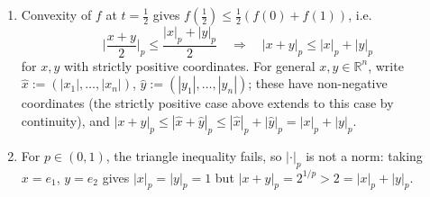 \begin{exercisesolution}
\begin{enumerate}[label=\textbf{\arabic*.}]
    shows the bracket is $\geq 0$. Since $g(t) > 0$ and $p \geq 1$, we get $f''(t) \geq 0$ for
    $p > 1$ (for $p=1$, $f$ is affine in $t$ and hence convex). Thus $f$ is convex on $[0,1]$.
  \item Convexity of $f$ at $t = \tfrac12$ gives $f(\tfrac12) \leq \tfrac12(f(0)+f(1))$, i.e.
    \[
    \Big|\frac{x+y}{2}\Big|_p \leq \frac{|x|_p + |y|_p}{2} \quad \Longrightarrow \quad |x+y|_p \leq |x|_p + |y|_p
    \]
    for $x, y$ with strictly positive coordinates. For general $x, y \in \mathbb{R}^n$, write
    $\hat x := (|x_1|,\dots,|x_n|)$, $\hat y := (|y_1|,\dots,|y_n|)$; these have non-negative
    coordinates (the strictly positive case above extends to this case by continuity), and
    $|x+y|_p \leq |\hat x + \hat y|_p \leq |\hat x|_p + |\hat y|_p = |x|_p + |y|_p$.
  \item For $p \in (0,1)$, the triangle inequality fails, so $|\cdot|_p$ is not a norm: taking
    $x = e_1$, $y = e_2$ gives $|x|_p = |y|_p = 1$ but $|x+y|_p = 2^{1/p} > 2 = |x|_p+|y|_p$.
\end{enumerate}
\end{exercisesolution}

